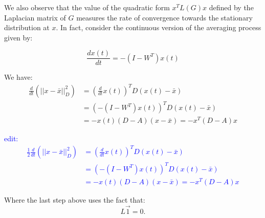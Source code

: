 \documentclass[11pt]{article}
\begin{document}
\noindent
We also observe that the value of the quadratic form $x^TL(G)x$ defined by the Laplacian matrix of $G$ measures the rate of convergence towards the stationary distribution at $x$. In fact, consider the continuous version of the averaging process given by:

\[
    \frac{dx(t)}{dt} = - (I-W^T)x(t)
\]


\noindent
We have:
\begin{align*}
    \frac{d}{dt}\left(||x - \bar{x}||_D^2\right) &= \left(\frac{d}{dt}x(t)\right)^TD(x(t)-\bar{x})\\
    &= \left(-(I-W^T)x(t)\right)^TD(x(t)-\bar{x})\\
    &= -x(t) (D-A)(x-\bar{x}) = -x^T(D-A)x
\end{align*}

\textcolor{blue}{edit:
\begin{align*}
    \frac{1}{2}\frac{d}{dt}\left(||x - \bar{x}||_D^2\right) &= \left(\frac{d}{dt}x(t)\right)^TD(x(t)-\bar{x})\\
    &= \left(-(I-W^T)x(t)\right)^TD(x(t)-\bar{x})\\
    &= -x(t) (D-A)(x-\bar{x}) = -x^T(D-A)x
\end{align*}}

\noindent
Where the last step above uses the fact that:
\[
    L\vec{1} = 0.
\]
\end{document}
